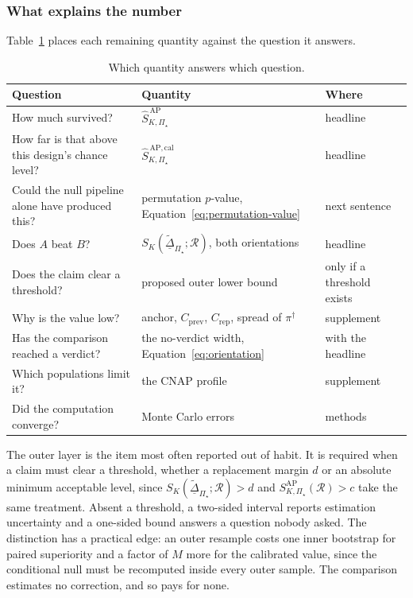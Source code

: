 \documentclass[11pt]{article}
\newcommand{\Regime}{\mathcal{R}}
\newcommand{\PSet}{\Pi_\star}
\newcommand{\SRob}{S_{K,\PSet}^{\mathrm{AP}}(\Regime)}
\newcommand{\SRobHat}{\widehat S_{K,\PSet}^{\,\mathrm{AP}}}
\newcommand{\SRobCalHat}{\widehat S_{K,\PSet}^{\,\mathrm{AP,cal}}}
\newcommand{\RobDta}{\underline{\widetilde{\Delta}}_{\PSet}}
\theoremstyle{remark}
\begin{document}
\subsubsection*{What explains the number}

Table~\ref{tab:reporting} places each remaining quantity against the question it answers.

\begin{table}[ht]
\centering
\caption{Which quantity answers which question.}
\label{tab:reporting}
\begin{tabularx}{\textwidth}{@{}XXl@{}}
\toprule
Question & Quantity & Where \\
\midrule
How much survived? & $\SRobHat$ & headline \\
How far is that above this design's chance level? & $\SRobCalHat$ & headline \\
Could the null pipeline alone have produced this? & permutation $p$-value, Equation~\eqref{eq:permutation-value} & next sentence \\
Does $A$ beat $B$? & $S_K(\RobDta;\Regime)$, both orientations & headline \\
Does the claim clear a threshold? & proposed outer lower bound & only if a threshold exists \\
Why is the value low? & anchor, $C_{\mathrm{prev}}$, $C_{\mathrm{rep}}$, spread of $\pi^\dagger$ & supplement \\
Has the comparison reached a verdict? & the no-verdict width, Equation~\eqref{eq:orientation} & with the headline \\
Which populations limit it? & the CNAP profile & supplement \\
Did the computation converge? & Monte Carlo errors & methods \\
\bottomrule
\end{tabularx}
\end{table}

The outer layer is the item most often reported out of habit. It is required when a claim must clear a threshold, whether a replacement margin $d$ or an absolute minimum acceptable level, since $S_K(\RobDta;\Regime)>d$ and $\SRob>c$ take the same treatment. Absent a threshold, a two-sided interval reports estimation uncertainty and a one-sided bound answers a question nobody asked. The distinction has a practical edge: an outer resample costs one inner bootstrap for paired superiority and a factor of $M$ more for the calibrated value, since the conditional null must be recomputed inside every outer sample. The comparison estimates no correction, and so pays for none.
\end{document}
